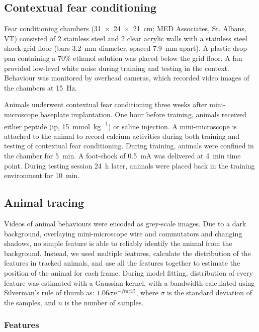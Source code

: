 \subsection{Contextual fear conditioning}
Fear conditioning chambers (\SI{31 x 24 x 21}{\cm}; MED Associates, St. Albans, VT) consisted of 2 stainless steel and 2 clear acrylic walls with a stainless steel shock-grid floor (bars \SI{3.2}{\mm} diameter, spaced \SI{7.9}{\mm} apart). A plastic drop-pan containing a 70\% ethanol solution was placed below the grid floor. A fan provided low-level white noise during training and testing in the context. Behaviour was monitored by overhead cameras, which recorded video images of the chambers at \SI{15}{\Hz}. 

Animals underwent contextual fear conditioning three weeks after mini-microscope baseplate implantation. One hour before training, animals received either \tglu peptide (\gls{ip}, \SI{15}{\mmol\per\kg}) or saline injection. A mini-microscope is attached to the animal to record calcium activities during both training and testing of contextual fear conditioning. During training, animals were confined in the chamber for \SI{5}{\minute}. A foot-shock of \SI{0.5}{\mA} was delivered at \SI{4}{\minute} time point. During testing session \SI{24}{\hour} later, animals were placed back in the training environment for \SI{10}{\minute}. 

\subsection{Animal tracing}
Videos of animal behaviours were encoded as grey-scale images. Due to a dark background, overlaying mini-microscope wire and commutators and changing shadows, no simple feature is able to reliably identify the animal from the background. Instead, we used multiple features, calculate the distribution of the features in tracked animals, and use all the features together to estimate the position of the animal for each frame. During model fitting, distribution of every feature was estimated with a Gaussian kernel, with a bandwidth calculated using Silverman's rule of thumb as: $1.06\sigma n^{-frac{1}{5}}$, where $\sigma$ is the standard deviation of the samples, and $n$ is the number of samples.

\subsubsection{Features}

